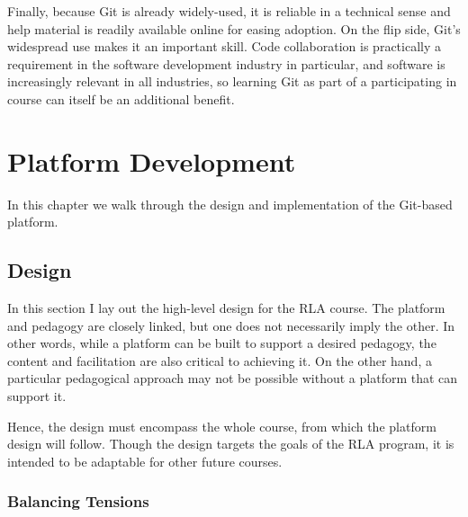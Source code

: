 \documentclass[12pt,twoside]{mitthesis}
\begin{document}
{Finally, because Git is already widely-used, it is reliable in a technical sense and help material is readily available online for easing adoption. On the flip side, Git's widespread use makes it an important skill. Code collaboration is practically a requirement in the software development industry in particular, and software is increasingly relevant in all industries, so learning Git as part of a participating in course can itself be an additional benefit.~\cite{haaranen2015teaching}}

\chapter{Platform Development}

In this chapter we walk through the design and implementation of the Git-based platform. 

\section{Design}

In this section I lay out the high-level design for the RLA course. The platform and pedagogy are closely linked, but one does not necessarily imply the other. In other words, while a platform can be built to support a desired pedagogy, the content and facilitation are also critical to achieving it. On the other hand, a particular pedagogical approach may not be possible without a platform that can support it. 

Hence, the design must encompass the whole course, from which the platform design will follow. Though the design targets the goals of the RLA program, it is intended to be adaptable for other future courses.

\subsection{Balancing Tensions}
\end{document}
